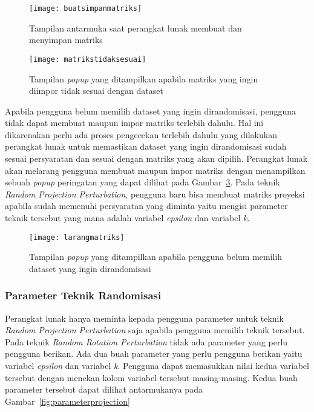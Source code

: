 \begin{figure}
	\centering
	\texttt{[image: buatsimpanmatriks]}
	\caption{Tampilan antarmuka saat perangkat lunak membuat dan menyimpan matriks}
	\label{fig:buatsimpanmatriks}
\end{figure}

\begin{figure}
	\centering
	\texttt{[image: matrikstidaksesuai]}
	\caption{Tampilan \textit{popup} yang ditampilkan apabila matriks yang ingin diimpor tidak sesuai dengan dataset}
	\label{fig:matrikstidaksesuai}
\end{figure}

Apabila pengguna belum memilih dataset yang ingin dirandomisasi, pengguna tidak dapat membuat maupun impor matriks terlebih dahulu. Hal ini dikarenakan perlu ada proses pengecekan terlebih dahulu yang dilakukan perangkat lunak untuk memastikan dataset yang ingin dirandomisasi sudah sesuai persyaratan dan sesuai dengan matriks yang akan dipilih. Perangkat lunak akan melarang pengguna membuat maupun impor matriks dengan menampilkan sebuah \textit{popup} peringatan yang dapat dilihat pada Gambar~\ref{fig:larangmatriks}. Pada teknik \textit{Random Projection Perturbation}, pengguna baru bisa membuat matriks proyeksi apabila sudah memenuhi persyaratan yang diminta yaitu mengisi parameter teknik tersebut yang mana adalah variabel \textit{epsilon} dan variabel \textit{k}.

\begin{figure}
	\centering
	\texttt{[image: larangmatriks]}
	\caption{Tampilan \textit{popup} yang ditampilkan apabila pengguna belum memilih dataset yang ingin dirandomisasi}
	\label{fig:larangmatriks}
\end{figure}

\subsubsection{Parameter Teknik Randomisasi}
\label{subsubsec:parameterteknik}

Perangkat lunak hanya meminta kepada pengguna parameter untuk teknik \textit{Random Projection Perturbation} saja apabila pengguna memilih teknik tersebut. Pada teknik \textit{Random Rotation Perturbation} tidak ada parameter yang perlu pengguna berikan. Ada dua buah parameter yang perlu pengguna berikan yaitu variabel \textit{epsilon} dan variabel \textit{k}. Pengguna dapat memasukkan nilai kedua variabel tersebut dengan menekan kolom variabel tersebut masing-masing. Kedua buah parameter tersebut dapat dilihat antarmukanya pada Gambar~\ref{fig:parameterprojection}

